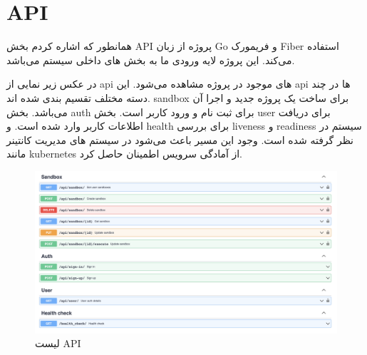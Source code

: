 
\section{API}

همانطور که اشاره کردم بخش API پروژه از زبان Go و فریمورک Fiber استفاده می‌کند.
این پروژه لایه ورودی ما به بخش های داخلی سیستم می‌باشد.

در عکس زیر نمایی از api های موجود در پروژه مشاهده می‌شود.
این api ها در چند دسته مختلف تقسیم بندی شده اند. sandbox برای ساخت یک پروژه جدید و اجرا آن می‌باشد.
بخش auth برای ثبت نام و ورود کاربر است.
بخش user برای دریافت اطلاعات کاربر وارد شده است.
و health برای بررسی liveness و readiness سیستم در نظر گرفته شده است.
وجود این مسیر باعث می‌شود در سیستم های مدیریت کانتینر مانند kubernetes از آمادگی سرویس اطمینان حاصل کرد.

\begin{figure}[hb]
    \centering
    \includegraphics[width=1\textwidth]{./3-Design/swagger.png}
    \caption{لیست API}
    \label{fig:swagger}
\end{figure}
